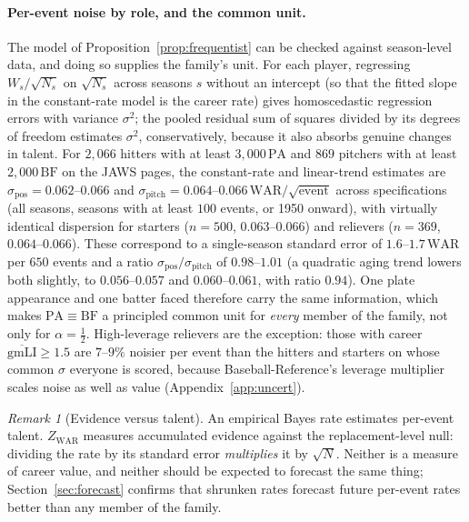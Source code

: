 \documentclass[11pt,letterpaper]{article}
\theoremstyle{plain}
\theoremstyle{definition}
\theoremstyle{remark}
\newtheorem{remark}{Remark}
\newcommand{\WAR}{\mathrm{WAR}}
\newcommand{\PA}{\mathrm{PA}}
\newcommand{\BF}{\mathrm{BF}}
\newcommand{\ZWAR}{Z_{\WAR}}
\begin{document}
\paragraph{Per-event noise by role, and the common unit.} The model of Proposition~\ref{prop:frequentist} can be checked against season-level data, and doing so supplies the family's unit. For each player, regressing $W_s/\sqrt{N_s}$ on $\sqrt{N_s}$ across seasons $s$ without an intercept (so that the fitted slope in the constant-rate model is the career rate) gives homoscedastic regression errors with variance $\sigma^2$; the pooled residual sum of squares divided by its degrees of freedom estimates $\sigma^2$, conservatively, because it also absorbs genuine changes in talent. For $2{,}066$ hitters with at least $3{,}000\,\PA$ and $869$ pitchers with at least $2{,}000\,\BF$ on the JAWS pages, the constant-rate and linear-trend estimates are $\sigma_{\mathrm{pos}} = 0.062$--$0.066$ and $\sigma_{\mathrm{pitch}} = 0.064$--$0.066\,\WAR/\sqrt{\text{event}}$ across specifications (all seasons, seasons with at least $100$ events, or 1950 onward), with virtually identical dispersion for starters ($n = 500$, $0.063$--$0.066$) and relievers ($n = 369$, $0.064$--$0.066$). These correspond to a single-season standard error of $1.6$--$1.7\,\WAR$ per $650$ events and a ratio $\sigma_{\mathrm{pos}}/\sigma_{\mathrm{pitch}}$ of $0.98$--$1.01$ (a quadratic aging trend lowers both slightly, to $0.056$--$0.057$ and $0.060$--$0.061$, with ratio $0.94$). One plate appearance and one batter faced therefore carry the same information, which makes $\PA \equiv \BF$ a principled common unit for \emph{every} member of the family, not only for $\alpha = \tfrac12$. High-leverage relievers are the exception: those with career $\overline{\mathrm{gmLI}} \ge 1.5$ are $7$--$9\%$ noisier per event than the hitters and starters on whose common $\sigma$ everyone is scored, because Baseball-Reference's leverage multiplier scales noise as well as value (Appendix~\ref{app:uncert}).

\begin{remark}[Evidence versus talent]
\label{rem:talent}
An empirical Bayes rate estimates per-event talent. $\ZWAR$ measures accumulated evidence against the replacement-level null: dividing the rate by its standard error \emph{multiplies} it by $\sqrt N$. Neither is a measure of career value, and neither should be expected to forecast the same thing; Section~\ref{sec:forecast} confirms that shrunken rates forecast future per-event rates better than any member of the family.
\end{remark}
\end{document}
